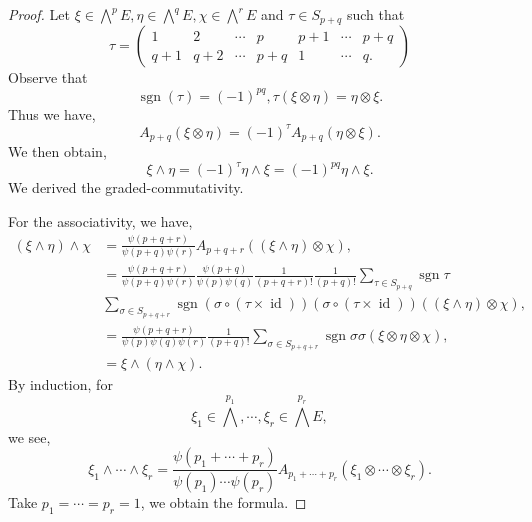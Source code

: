 \documentclass[10pt]{article}
\DeclareMathOperator{\id}{id}
\DeclareMathOperator{\sgn}{sgn}
\begin{document}
\begin{proof}
  Let $\xi\in\bigwedge^pE,\eta\in \bigwedge^qE,\chi\in\bigwedge^rE$ and $\tau\in S_{p+q}$ such that 
  \begin{equation*}
    \tau = \begin{pmatrix}
      1 & 2 &\cdots & p & p+1&\cdots&p+q\\
      q+1 & q+2& \cdots &p+q& 1 & \cdots & q.
    \end{pmatrix}
  \end{equation*}
  Observe that 
  \begin{equation*}
    \sgn(\tau) = (-1)^{pq},\tau(\xi\otimes \eta) = \eta\otimes \xi.
  \end{equation*}
  Thus we have,
  \begin{equation*}
    A_{p+q}(\xi\otimes \eta) = (-1)^\tau A_{p+q}(\eta\otimes \xi).
  \end{equation*}
  We then obtain,
  \begin{equation*}
    \xi\wedge\eta = (-1)^\tau\eta\wedge\xi = (-1)^{pq}\eta\wedge\xi.
  \end{equation*}
  We derived the graded-commutativity.\\
  \par For the associativity, we have,
  \begin{align*}
    (\xi\wedge \eta)\wedge\chi & = {\frac {\psi(p+q+r)} {\psi(p+q)\psi(r)}} A_{p+q+r}((\xi\wedge\eta)\otimes \chi),\\
    & = {\frac {\psi(p+q+r)} {\psi(p+q)\psi(r)}}{\frac {\psi(p+q)} {\psi(p)\psi(q)}} {\frac 1 {(p+q+r)!}}{\frac 1 {(p+q)!}}\sum_{\tau\in S_{p+q}}\sgn\tau\\
    &\sum_{\sigma\in S_{p+q+r}}\sgn(\sigma\circ(\tau\times\id))(\sigma\circ(\tau\times \id))((\xi\wedge\eta)\otimes \chi),\\
    & = {\frac {\psi(p+q+r)} {\psi(p)\psi(q)\psi(r)}}{\frac 1 {(p+q)!}}\sum_{\sigma\in S_{p+q+r}}\sgn\sigma\sigma(\xi\otimes\eta\otimes\chi),\\
    & = \xi\wedge(\eta\wedge\chi).
  \end{align*}
  By induction, for
  \begin{equation*}
    \xi_1\in\bigwedge^{p_1},\cdots,\xi_r\in\bigwedge^{p_r}E,
  \end{equation*}
  we see,
  \begin{equation*}
    \xi_1\wedge\cdots\wedge \xi_r = {\frac {\psi(p_1+\cdots+p_r)} {\psi(p_1)\cdots\psi(p_r)}}A_{p_1+\cdots+p_r}(\xi_1\otimes\cdots\otimes\xi_r).
  \end{equation*}
  Take $p_1=\cdots=p_r=1$, we obtain the formula.

\end{proof}
\end{document}
